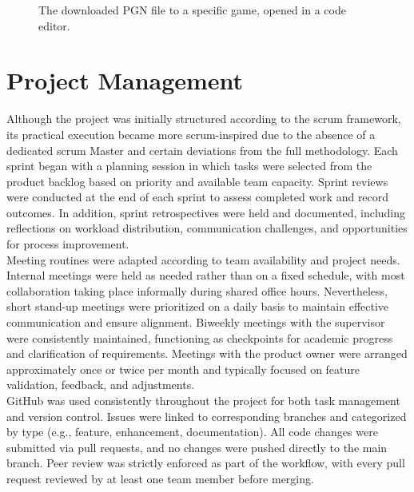 \begin{figure}[h!] \centering {}\caption[PGN file and metadata]{The downloaded PGN file to a specific game, opened in a code editor.}\label{fig:downloaded-pgn} \end{figure}

\section{Project Management}
\label{sec:results-project-management}
Although the project was initially structured according to the \gls{scrum} framework, its practical execution became more \gls{scrum}-inspired due to the absence of a dedicated \gls{scrum} Master and certain deviations from the full methodology. Each sprint began with a planning session in which tasks were selected from the product backlog based on priority and available team capacity. Sprint reviews were conducted at the end of each sprint to assess completed work and record outcomes. In addition, sprint retrospectives were held and documented, including reflections on workload distribution, communication challenges, and opportunities for process improvement. \\

Meeting routines were adapted according to team availability and project needs. Internal meetings were held as needed rather than on a fixed schedule, with most collaboration taking place informally during shared office hours. Nevertheless, short stand-up meetings were prioritized on a daily basis to maintain effective communication and ensure alignment. Biweekly meetings with the supervisor were consistently maintained, functioning as checkpoints for academic progress and clarification of requirements. Meetings with the product owner were arranged approximately once or twice per month and typically focused on feature validation, feedback, and adjustments. \\

GitHub was used consistently throughout the project for both task management and version control. Issues were linked to corresponding branches and categorized by type (e.g., feature, enhancement, documentation). All code changes were submitted via pull requests, and no changes were pushed directly to the main branch. Peer review was strictly enforced as part of the workflow, with every pull request reviewed by at least one team member before merging. \\

